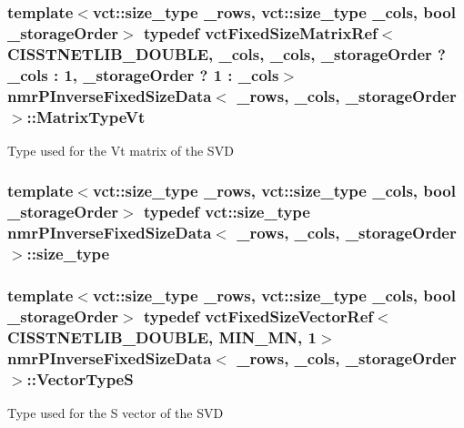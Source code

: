 \subsubsection[{Matrix\+Type\+Vt}]{\setlength{\rightskip}{0pt plus 5cm}template$<$vct\+::size\+\_\+type \+\_\+rows, vct\+::size\+\_\+type \+\_\+cols, bool \+\_\+storage\+Order$>$ typedef {\bf vct\+Fixed\+Size\+Matrix\+Ref}$<$C\+I\+S\+S\+T\+N\+E\+T\+L\+I\+B\+\_\+\+D\+O\+U\+B\+L\+E, \+\_\+cols, \+\_\+cols, \+\_\+storage\+Order ? \+\_\+cols \+: 1, \+\_\+storage\+Order ? 1 \+: \+\_\+cols$>$ {\bf nmr\+P\+Inverse\+Fixed\+Size\+Data}$<$ \+\_\+rows, \+\_\+cols, \+\_\+storage\+Order $>$\+::{\bf Matrix\+Type\+Vt}}\label{classnmr_p_inverse_fixed_size_data_a61bc7c8325cf61f5c530759364ce185a}
Type used for the Vt matrix of the S\+V\+D \hypertarget{classnmr_p_inverse_fixed_size_data_a10ebf99e82bb3dd2afd42fc723fac07b}{}
\subsubsection[{size\+\_\+type}]{\setlength{\rightskip}{0pt plus 5cm}template$<$vct\+::size\+\_\+type \+\_\+rows, vct\+::size\+\_\+type \+\_\+cols, bool \+\_\+storage\+Order$>$ typedef {\bf vct\+::size\+\_\+type} {\bf nmr\+P\+Inverse\+Fixed\+Size\+Data}$<$ \+\_\+rows, \+\_\+cols, \+\_\+storage\+Order $>$\+::{\bf size\+\_\+type}}\label{classnmr_p_inverse_fixed_size_data_a10ebf99e82bb3dd2afd42fc723fac07b}
\hypertarget{classnmr_p_inverse_fixed_size_data_a55ba424dddf7bd0797b80bc468a209b0}{}
\subsubsection[{Vector\+Type\+S}]{\setlength{\rightskip}{0pt plus 5cm}template$<$vct\+::size\+\_\+type \+\_\+rows, vct\+::size\+\_\+type \+\_\+cols, bool \+\_\+storage\+Order$>$ typedef {\bf vct\+Fixed\+Size\+Vector\+Ref}$<$C\+I\+S\+S\+T\+N\+E\+T\+L\+I\+B\+\_\+\+D\+O\+U\+B\+L\+E, {\bf M\+I\+N\+\_\+\+M\+N}, 1$>$ {\bf nmr\+P\+Inverse\+Fixed\+Size\+Data}$<$ \+\_\+rows, \+\_\+cols, \+\_\+storage\+Order $>$\+::{\bf Vector\+Type\+S}}\label{classnmr_p_inverse_fixed_size_data_a55ba424dddf7bd0797b80bc468a209b0}
Type used for the S vector of the S\+V\+D \hypertarget{classnmr_p_inverse_fixed_size_data_aedbceacb820ab99ce724431b6f38d56e}{}
